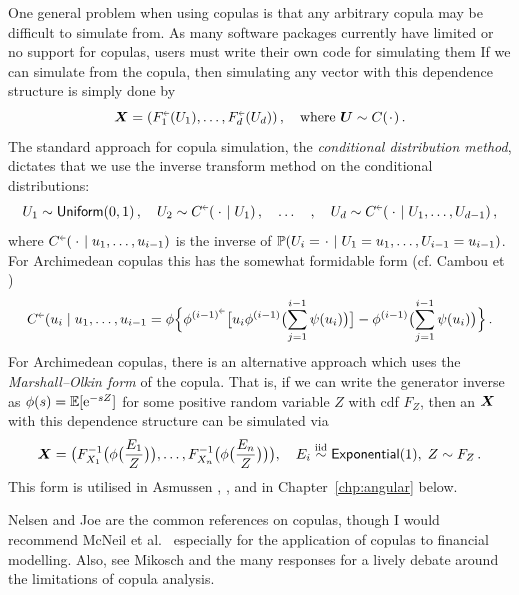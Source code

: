 One general problem when using copulas is that any arbitrary copula may be difficult to simulate from. As many software packages currently have limited or no support for copulas, users must write their own code for simulating them
If we can simulate from the copula, then simulating any vector with this dependence structure is simply done by
\[ \bfX = (F_1^{\ginv}(U_1), \dots, F_d^{\ginv}(U_d)) \,, \quad \text{where } \bfU \sim C(\argdot)\,. \]
The standard approach for copula simulation, the \emph{conditional distribution method}, dictates that we use the inverse transform method on the conditional distributions:
\[ U_1 \sim \UnifDist(0,1)\,,\quad U_2 \sim C^{\ginv}(\,\argdot \mid U_1)\,, \quad \dots \quad, \quad U_d \sim C^{\ginv}(\,\argdot \mid U_1, \dots, U_{d-1}) \,, \]
where $C^{\ginv}(\,\argdot \mid u_1, \dots, u_{i-1})$ is the inverse of $\Prob(U_i = \argdot \mid U_1 = u_1, \dots, U_{i-1} = u_{i-1})$. For Archimedean copulas this has the somewhat formidable form (cf. Cambou et \cite{cambou2017quasi})
\[ C^{\ginv}(u_i \mid u_1, \dots, u_{i-1} = \phi\Bigl\{  \phi^{(i-1)^{\ginv}} \bigl[ u_i \phi^{(i-1)}\bigl( \sum_{j=1}^{i-1} \psi(u_i) \bigr)  \bigr] - \phi^{(i-1)}\bigl( \sum_{j=1}^{i-1} \psi(u_i) \bigr) \Bigr\} \,. \]
For Archimedean copulas, there is an alternative approach which uses the \emph{Marshall--Olkin form} of the copula. That is, if we can write the generator inverse as $\phi(s) = \operatorname{{\mathbb E}}[\mathrm{e}^{-s Z}]$ for some positive random variable $Z$ with cdf $F_Z$, then an $\bm{X}$ with this dependence structure can be simulated via
\[
\bm{X} = \bigl(F_{X_1}^{-1}\bigl( \phi\bigl(\frac{E_1}{Z}\bigr) \bigr), \dots, F_{X_n}^{-1}\bigl( \phi\bigl(\frac{E_n}{Z}\bigr) \bigr) \bigr) , \quad E_i \overset{\smash{\mathrm{iid}}}{\sim} \mathsf{Exponential}(1),\; Z \sim F_Z \,.
\]
This form is utilised in Asmussen \cite{asmussen2017conditional}, \cite{Pushout}, and in Chapter~\ref{chp:angular} below.

Nelsen \cite{nelsen2006introduction} and Joe \cite{joe1997multivariate} are the common references on copulas, though I would recommend McNeil et al.\ \cite{mcneil2015quantitative} especially for the application of copulas to financial modelling. Also, see Mikosch \cite{mikosch2006Copula} and the many responses for a lively debate around the limitations of copula analysis.


